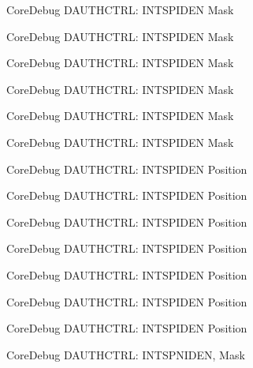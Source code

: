 \begin{DoxyRefList}
\label{deprecated__deprecated000144}%
%
Core\+Debug D\+A\+U\+T\+H\+C\+T\+RL\+: I\+N\+T\+S\+P\+I\+D\+EN Mask 

\label{deprecated__deprecated000220}%
%
Core\+Debug D\+A\+U\+T\+H\+C\+T\+RL\+: I\+N\+T\+S\+P\+I\+D\+EN Mask 

\label{deprecated__deprecated000283}%
%
Core\+Debug D\+A\+U\+T\+H\+C\+T\+RL\+: I\+N\+T\+S\+P\+I\+D\+EN Mask 

\label{deprecated__deprecated000362}%
%
Core\+Debug D\+A\+U\+T\+H\+C\+T\+RL\+: I\+N\+T\+S\+P\+I\+D\+EN Mask 

\label{deprecated__deprecated000438}%
%
Core\+Debug D\+A\+U\+T\+H\+C\+T\+RL\+: I\+N\+T\+S\+P\+I\+D\+EN Mask 

\label{deprecated__deprecated000541}%
%
Core\+Debug D\+A\+U\+T\+H\+C\+T\+RL\+: I\+N\+T\+S\+P\+I\+D\+EN Mask  
\item[Member \mbox{\hyperlink{group__CMSIS__CoreDebug_ga3caef9790e4e2ccbfea77d55315ad59f}{Core\+Debug\+\_\+\+D\+A\+U\+T\+H\+C\+T\+R\+L\+\_\+\+I\+N\+T\+S\+P\+I\+D\+E\+N\+\_\+\+Pos}} ]\label{deprecated__deprecated000089}%
%
Core\+Debug D\+A\+U\+T\+H\+C\+T\+RL\+: I\+N\+T\+S\+P\+I\+D\+EN Position 

\label{deprecated__deprecated000143}%
%
Core\+Debug D\+A\+U\+T\+H\+C\+T\+RL\+: I\+N\+T\+S\+P\+I\+D\+EN Position 

\label{deprecated__deprecated000219}%
%
Core\+Debug D\+A\+U\+T\+H\+C\+T\+RL\+: I\+N\+T\+S\+P\+I\+D\+EN Position 

\label{deprecated__deprecated000282}%
%
Core\+Debug D\+A\+U\+T\+H\+C\+T\+RL\+: I\+N\+T\+S\+P\+I\+D\+EN Position 

\label{deprecated__deprecated000361}%
%
Core\+Debug D\+A\+U\+T\+H\+C\+T\+RL\+: I\+N\+T\+S\+P\+I\+D\+EN Position 

\label{deprecated__deprecated000437}%
%
Core\+Debug D\+A\+U\+T\+H\+C\+T\+RL\+: I\+N\+T\+S\+P\+I\+D\+EN Position 

\label{deprecated__deprecated000540}%
%
Core\+Debug D\+A\+U\+T\+H\+C\+T\+RL\+: I\+N\+T\+S\+P\+I\+D\+EN Position  
\item[Member \mbox{\hyperlink{group__CMSIS__CoreDebug_gadad0bf68d32cba49c1ea7534122c2752}{Core\+Debug\+\_\+\+D\+A\+U\+T\+H\+C\+T\+R\+L\+\_\+\+I\+N\+T\+S\+P\+N\+I\+D\+E\+N\+\_\+\+Msk}} ]\label{deprecated__deprecated000086}%
%
Core\+Debug D\+A\+U\+T\+H\+C\+T\+RL\+: I\+N\+T\+S\+P\+N\+I\+D\+EN, Mask 


\end{DoxyRefList}
